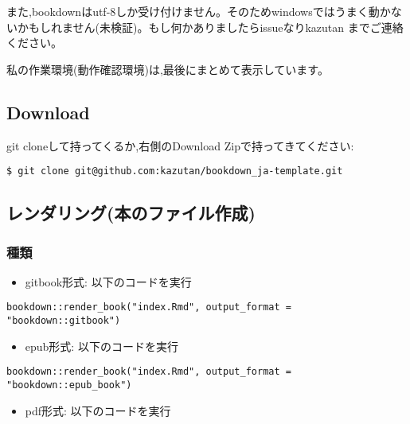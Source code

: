 \documentclass[
]{book}
\providecommand{\tightlist}{%
  \setlength{\itemsep}{0pt}\setlength{\parskip}{0pt}}
\begin{document}
また,bookdownはutf-8しか受け付けません。そのためwindowsではうまく動かないかもしれません(未検証)。もし何かありましたらissueなりkazutan までご連絡ください。

私の作業環境(動作確認環境)は,最後にまとめて表示しています。

\hypertarget{download}{%
\subsection{Download}\label{download}}

git cloneして持ってくるか,右側のDownload Zipで持ってきてください:

\begin{verbatim}
$ git clone git@github.com:kazutan/bookdown_ja-template.git
\end{verbatim}

\hypertarget{ux30ecux30f3ux30c0ux30eaux30f3ux30b0ux672cux306eux30d5ux30a1ux30a4ux30ebux4f5cux6210}{%
\subsection{レンダリング(本のファイル作成)}\label{ux30ecux30f3ux30c0ux30eaux30f3ux30b0ux672cux306eux30d5ux30a1ux30a4ux30ebux4f5cux6210}}

\hypertarget{ux7a2eux985e}{%
\subsubsection{種類}\label{ux7a2eux985e}}

\begin{itemize}
\tightlist
\item
  gitbook形式: 以下のコードを実行
\end{itemize}

\begin{verbatim}
bookdown::render_book("index.Rmd", output_format = "bookdown::gitbook")
\end{verbatim}

\begin{itemize}
\tightlist
\item
  epub形式: 以下のコードを実行
\end{itemize}

\begin{verbatim}
bookdown::render_book("index.Rmd", output_format = "bookdown::epub_book")
\end{verbatim}

\begin{itemize}
\tightlist
\item
  pdf形式: 以下のコードを実行
\end{itemize}
\end{document}
